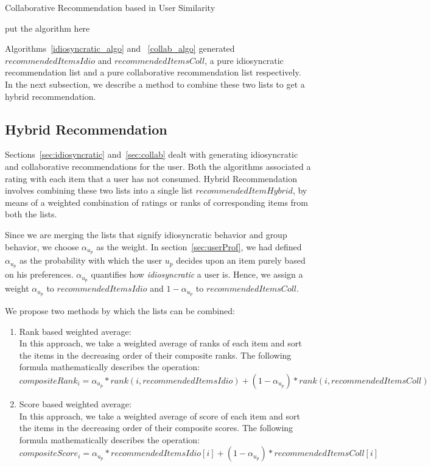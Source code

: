 \documentclass{acm_proc_article-sp}
\begin{document}
\begin{algorithm}
\label{collab_algo}
\caption{Collaborative Recommendation based in User Similarity}
\begin{algorithmic}[1]
  \STATE put the algorithm here
\end{algorithmic}
\end{algorithm}

Algorithms~\ref{idiosyncratic_algo} and ~\ref{collab_algo} generated $recommendedItemsIdio$ and $recommendedItemsColl$, a pure idiosyncratic recommendation list and a pure collaborative recommendation list respectively. In the next subsection, we describe a method to combine these two lists to get a hybrid recommendation.

\subsection{Hybrid Recommendation}
\label{sec:hybrid}
Sections~\ref{sec:idiosyncratic} and~\ref{sec:collab} dealt with generating idiosyncratic and collaborative recommendations for the user. Both the algorithms associated a rating with each item that a user has not consumed. Hybrid Recommendation involves combining these two lists into a single list $recommendedItemHybrid$, by means of a weighted combination of ratings or ranks of corresponding items from both the lists.

Since we are merging the lists that signify idiosyncratic behavior and group behavior, we choose $\alpha_{u_p}$ as the weight. In section~\ref{sec:userProf}, we had defined $\alpha_{u_p}$ as the probability with which the user $u_p$ decides upon an item purely based on his preferences. $\alpha_{u_p}$ quantifies how \emph{idiosyncratic} a user is. Hence, we assign a weight $\alpha_{u_p}$ to $recommendedItemsIdio$ and $1 - \alpha_{u_p}$ to $recommendedItemsColl$.

We propose two methods by which the lists can be combined:
\begin{enumerate}
 \item Rank based weighted average:\\
 In this approach, we take a weighted average of ranks of each item and sort the items in the decreasing order of their composite ranks. The following formula mathematically describes the operation:\\
 $compositeRank_i = \alpha_{u_p}*rank(i, recommendedItemsIdio) + (1 - \alpha_{u_p})*rank(i, recommendedItemsColl)$
 
 \item Score based weighted average:\\
 In this approach, we take a weighted average of score of each item and sort the items in the decreasing order of their composite scores. The following formula mathematically describes the operation:\\
 $compositeScore_i = \alpha_{u_p}*recommendedItemsIdio[i] + (1 - \alpha_{u_p})*recommendedItemsColl[i]$
\end{enumerate}
\end{document}
